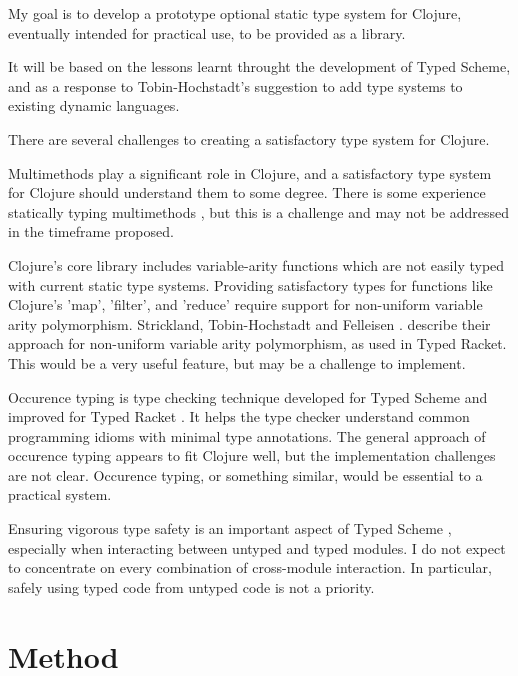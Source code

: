 \documentclass[12pt, a4paper]{article}
\begin{document}
My goal is to develop a prototype optional static type system for Clojure, 
eventually intended for practical use, to be provided as a library.

It will be based on the lessons learnt throught the development
of Typed Scheme, and as a response to Tobin-Hochstadt's \cite{TypedScheme:2010}
suggestion to add type systems to existing dynamic languages.

There are several challenges to creating a satisfactory type system for Clojure.

Multimethods play a significant role in Clojure, and a satisfactory
type system for Clojure should understand them to some degree.
There is some experience statically typing multimethods
\cite{Millstein02modularstatically}
, but this is a challenge and may not be addressed in the
timeframe proposed.

Clojure's core library includes variable-arity functions which
are not easily typed with current static type systems. 
Providing satisfactory types for functions 
like Clojure's 'map', 'filter', and 'reduce' require
support for non-uniform variable arity polymorphism. 
Strickland, Tobin-Hochstadt and Felleisen \cite{Strickland:2009:PVP:1532974.1532978}.
describe their approach for non-uniform variable arity polymorphism, as used
in Typed Racket. 
This would be a very useful feature, but may be a challenge to implement.

Occurence typing is type checking technique developed for Typed Scheme 
\cite{Tobin-Hochstadt:2008:DIT:1328897.1328486}
and improved for Typed Racket
\cite{Tobin-Hochstadt:2010:LTU:1932681.1863561}.
It helps the type checker understand common programming idioms 
with minimal type annotations.
The general approach of occurence typing appears to fit Clojure well,
but the implementation challenges are not clear. Occurence typing,
or something similar, would be essential to a practical system.

Ensuring vigorous type safety is an important aspect of Typed Scheme 
\cite{TypedScheme:2010} ,
especially when interacting between untyped and typed modules.
I do not expect to concentrate on every combination of cross-module
interaction. In particular, safely using typed code from untyped code
is not a priority.

\section*{Method}

\end{document}
